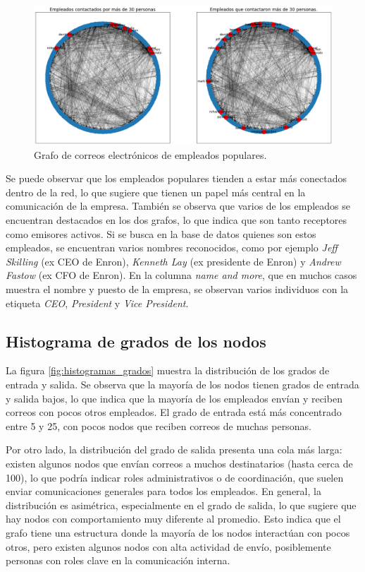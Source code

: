 \documentclass{article}
\begin{document}
\begin{figure}[htb]
    \centering
    \includegraphics[width=0.8\linewidth]{imagenes/ej1/empleados_populares.png}
    \caption{Grafo de correos electrónicos de empleados populares.}
    \label{fig:grafos_populares}
\end{figure}

Se puede observar que los empleados populares tienden a estar más conectados dentro de la red, lo que sugiere que tienen un papel más central en la comunicación de la empresa. También se observa que varios de los empleados se encuentran destacados en los dos grafos, lo que indica que son tanto receptores como emisores activos. Si se busca en la base de datos quienes son estos empleados, se encuentran varios nombres reconocidos, como por ejemplo \textit{Jeff Skilling} (ex CEO de Enron), \textit{Kenneth Lay} (ex presidente de Enron) y \textit{Andrew Fastow} (ex CFO de Enron). En la columna \textit{name and more}, que en muchos casos muestra el nombre y puesto de la empresa, se observan varios individuos con la etiqueta \textit{CEO}, \textit{President} y \textit{Vice President}.

\subsection{Histograma de grados de los nodos}

La figura \ref{fig:histogramas_grados} muestra la distribución de los grados de entrada y salida. Se observa que la mayoría de los nodos tienen grados de entrada y salida bajos, lo que indica que la mayoría de los empleados envían y reciben correos con pocos otros empleados. El grado de entrada está más concentrado entre 5 y 25, con pocos nodos que reciben correos de muchas personas.

Por otro lado, la distribución del grado de salida presenta una cola más larga: existen algunos nodos que envían correos a muchos destinatarios (hasta cerca de 100), lo que podría indicar roles administrativos o de coordinación, que suelen enviar comunicaciones generales para todos los empleados. En general, la distribución es asimétrica, especialmente en el grado de salida, lo que sugiere que hay nodos con comportamiento muy diferente al promedio. Esto indica que el grafo tiene una estructura donde la mayoría de los nodos interactúan con pocos otros, pero existen algunos nodos con alta actividad de envío, posiblemente personas con roles clave en la comunicación interna.
\end{document}
